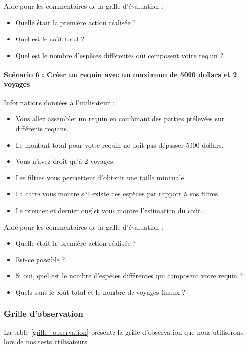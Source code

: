 \documentclass{article}
\begin{document}
Aide pour les commentaires de la grille d'évaluation :
\begin{itemize}
	\item Quelle était la première action réalisée ?
	\item Quel est le coût total ?
	\item Quel est le nombre d'espèces différentes qui composent votre requin ?
\end{itemize}

\paragraph{Scénario 6 : Créer un requin avec un maximum de 5000 dollars et 2 voyages}

Informations données à l'utilisateur :
\begin{itemize}
	\item Vous allez assembler un requin en combinant des parties prélevées sur différents requins.
	\item Le montant total pour votre requin ne doit pas dépasser 5000 dollars.
	\item Vous n'avez droit qu'à 2 voyages.
	\item Les filtres vous permettent d'obtenir une taille minimale.
	\item La carte vous montre s'il existe des espèces par rapport à vos filtres.
	\item Le premier et dernier onglet vous montre l'estimation du coût.
\end{itemize}

Aide pour les commentaires de la grille d'évaluation :
\begin{itemize}
	\item Quelle était la première action réalisée ?
	\item Est-ce possible ?
	\item Si oui, quel est le nombre d'espèces différentes qui composent votre requin ?
	\item Quels sont le coût total et le nombre de voyages finaux ?
\end{itemize}

\subsubsection{Grille d'observation}

La table \ref{grille_observation} présente la grille d'observation que nous utiliserons lors de nos tests utilisateurs.
\end{document}
